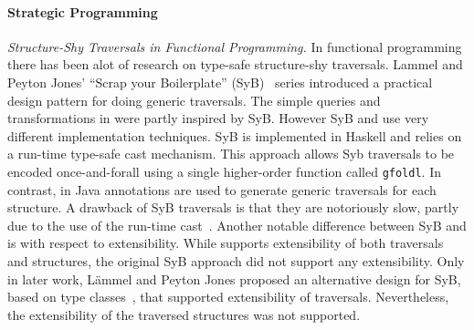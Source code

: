\cite{palsberg98essence}

\cite{bravenboer2001guiding}

\cite{lammel2002typed}


\paragraph{Strategic Programming}

\cite{lammel2003strategic}

\cite{borovansky1996elan}

\cite{visser1998core}



\textit{Structure-Shy Traversals in Functional Programming.}  In
functional programming there has been alot of research on type-safe
structure-shy traversals. Lammel and Peyton Jones' ``Scrap your
Boilerplate'' (SyB)~\cite{ralf03syb,lammel04syb,lammel05syb} series
introduced a practical design pattern for doing generic
traversals. The simple queries and transformations in
\name were partly inspired by SyB. However SyB and \name use very
different implementation techniques. SyB is implemented in Haskell and
relies on a run-time type-safe cast mechanism. This approach allows
Syb traversals to be encoded once-and-forall using a single
higher-order function called \lstinline{gfoldl}. In contrast, in \name
Java annotations are used to generate generic traversals for each
structure. A drawback of SyB traversals is that they are notoriously
slow, partly due to the use of the run-time
cast~\cite{adams2012tyb}. Another notable difference between SyB and
\name is with respect to extensibility. While \name supports
extensibility of both traversals and structures, the original SyB
approach did not support any extensibility. Only in later work,
L\"ammel and Peyton Jones proposed an alternative design for SyB,
based on type classes~\cite{wadler89type-classes}, that supported
extensibility of traversals. Nevertheless, the extensibility of the
traversed structures was not supported.


